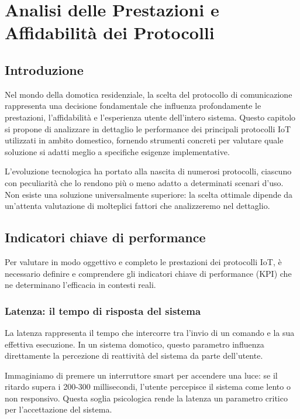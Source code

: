 \chapter{Analisi delle Prestazioni e Affidabilità dei Protocolli}

\section{Introduzione}

Nel mondo della domotica residenziale, la scelta del protocollo di comunicazione rappresenta una decisione fondamentale che influenza profondamente le prestazioni, l'affidabilità e l'esperienza utente dell'intero sistema. Questo capitolo si propone di analizzare in dettaglio le performance dei principali protocolli IoT utilizzati in ambito domestico, fornendo strumenti concreti per valutare quale soluzione si adatti meglio a specifiche esigenze implementative.

L'evoluzione tecnologica ha portato alla nascita di numerosi protocolli, ciascuno con peculiarità che lo rendono più o meno adatto a determinati scenari d'uso. Non esiste una soluzione universalmente superiore: la scelta ottimale dipende da un'attenta valutazione di molteplici fattori che analizzeremo nel dettaglio.

\section{Indicatori chiave di performance}

Per valutare in modo oggettivo e completo le prestazioni dei protocolli IoT, è necessario definire e comprendere gli indicatori chiave di performance (KPI) che ne determinano l'efficacia in contesti reali.

\subsection{Latenza: il tempo di risposta del sistema}

La latenza rappresenta il tempo che intercorre tra l'invio di un comando e la sua effettiva esecuzione. In un sistema domotico, questo parametro influenza direttamente la percezione di reattività del sistema da parte dell'utente.

Immaginiamo di premere un interruttore smart per accendere una luce: se il ritardo supera i 200-300 millisecondi, l'utente percepisce il sistema come lento o non responsivo. Questa soglia psicologica rende la latenza un parametro critico per l'accettazione del sistema.

